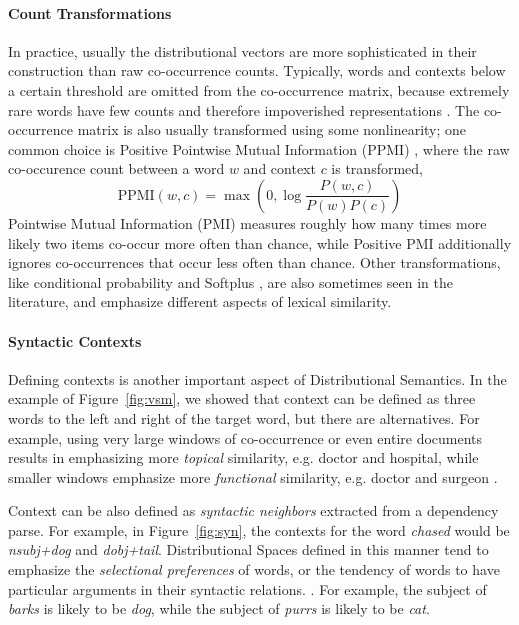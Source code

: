 \documentclass[12pt]{article}
\begin{document}
\paragraph{Count Transformations}
In practice, usually the distributional vectors are more sophisticated in their
construction than raw co-occurrence counts.  Typically, words and contexts
below a certain threshold are omitted from the co-occurrence matrix, because
extremely rare words have few counts and therefore impoverished representations
\cite{turney:2010:jair}. The co-occurrence matrix is also usually transformed
using some nonlinearity; one common choice is Positive Pointwise Mutual
Information (PPMI) \cite{bullinaria:2007:brm}, where the raw co-occurence count
between a word $w$ and context $c$ is transformed,
\begin{equation*}
  \text{PPMI}(w, c) = \max\left(0, \log\frac{P(w, c)}{P(w)P(c)}\right)
\end{equation*}
Pointwise Mutual Information (PMI) measures roughly how many times more likely two
items co-occur more often than chance, while Positive PMI
additionally ignores co-occurrences that occur less often than chance.  Other
transformations, like conditional probability
\cite{hofman:1999:sigir,blei:2003:jmlr} and Softplus
\cite{pennington:2014:emnlp}, are also sometimes seen in the literature, and
emphasize different aspects of lexical similarity.

\paragraph{Syntactic Contexts}
Defining contexts is another important aspect of Distributional Semantics.
In the example of Figure~\ref{fig:vsm}, we showed that context can be defined
as three words to the left and right of the target word, but there are
alternatives. For example, using very large windows of co-occurrence or even
entire documents results in emphasizing more {\em topical} similarity, e.g. doctor
and hospital, while smaller windows emphasize more {\em functional} similarity, e.g.
doctor and surgeon \cite{pado:2007:cl,erk:2008:emnlp,levy:2014:acl}.

Context can be also defined as {\em syntactic neighbors} extracted from a
dependency parse. For example, in Figure~\ref{fig:syn}, the
contexts for the word {\em chased} would be {\em nsubj+dog} and {\em
dobj+tail}. Distributional Spaces defined in this manner tend to emphasize the
{\em selectional preferences} of words, or the tendency of words to have
particular arguments in their syntactic relations.
\cite{pado:2007:cl,erk:2008:emnlp,baroni:2010:cl,levy:2014:acl}. For example,
the subject of {\em barks} is likely to be {\em dog}, while the subject of
{\em purrs} is likely to be {\em cat}.
\end{document}
